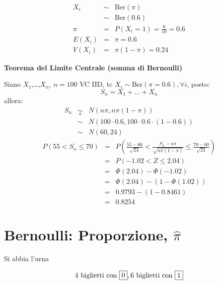 \documentclass[
  11pt,
]{book}
\theoremstyle{mytheoremstyle}
\theoremstyle{mydefstyle}
\newenvironment{sol}
  {
  \begin{tcolorbox}[enhanced,breakable,arc=0.1mm,boxrule=1pt,colback=white,colframe=iblue,
  title=\bf \fontfamily{lmss}\selectfont \hspace{.5 cm} Soluzione,drop fuzzy shadow]

}{
\end{tcolorbox}
  }
\begin{document}
\begin{sol}
\begin{eqnarray*}
X_{i}         &\sim& \mbox{Ber}(\pi)         \\
              &\sim& \mbox{Ber}(0.6)        \\
\pi           &=& P(X_{i} = 1) = \frac{6} {10} = 0.6       \\
E(X_{i})      &=& \pi = 0.6                                \\
V(X_{i})      &=& \pi (1-\pi) = 0.24                      
\end{eqnarray*}

\textbf{Teorema del Limite Centrale (somma di Bernoulli)}

Siano \(X_1\),\ldots,\(X_n\), \(n=100\) VC IID, tc \(X_i\sim\text{Ber}(\pi=0.6)\)\(,\forall i\), posto:
\[
      S_n = X_1 + ... + X_n
      \]
allora:\begin{eqnarray*}
  S_n & \mathop{\sim}\limits_{a}& N(n\pi,n\pi(1-\pi)) \\
      &\sim & N(100\cdot0.6,100\cdot0.6\cdot(1-0.6)) \\
      &\sim & N(60,24)
  \end{eqnarray*}\begin{eqnarray*}
   P( 55 < S_n \leq  70 ) &=& P\left( \frac { 55  -  60 }{\sqrt{ 24 }} < \frac { S_n  -  n\pi }{ \sqrt{n\pi(1-\pi)} } \leq \frac { 70  -  60 }{\sqrt{ 24 }}\right)  \\
              &=& P\left(  -1.02  < Z \leq  2.04 \right) \\
              &=& \Phi( 2.04 )-\Phi( -1.02 )\\
              &=&  \Phi( 2.04 )-(1-\Phi( 1.02 )) \\ &=&  0.9793 -(1- 0.8461 ) \\ 
              &=&  0.8254 
   \end{eqnarray*}

\end{sol}

\section{\texorpdfstring{Bernoulli: Proporzione, \(\widehat{\pi}\)}{Bernoulli: Proporzione, \textbackslash widehat\{\textbackslash pi\}}}\label{bernoulli-proporzione-widehatpi}

Si abbia l'urna

\[4\text{ biglietti con } \fbox{0}, 6\text{ biglietti con } \fbox{1}\]
\end{document}
